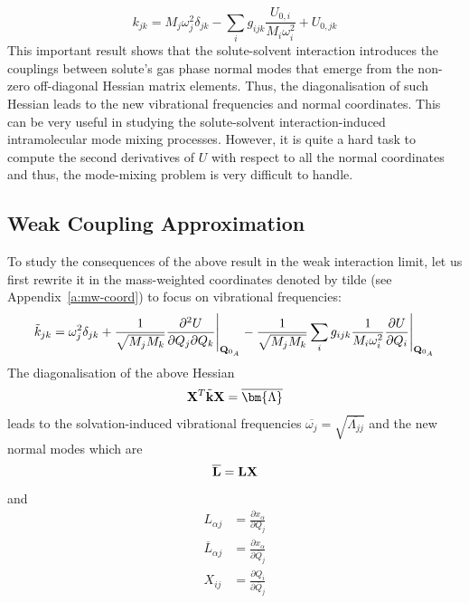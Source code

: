 \documentclass[b5paper,oneside,fleqn,11pt]{book}
\newcommand{\BM}[1]{\bm{#1}}
\newcommand{\fderiv}[2]{\ensuremath{
    \frac{\partial #1}{\partial #2}}}
\newcommand{\sderivd}[3]{\ensuremath{
    \frac{\partial^2 #1}{\partial #2 \partial #3}
    }}
\begin{document}
\begin{refsection}
\begin{equation}
\boxed{
 k_{jk} = M_j \omega_j^2 \delta_{jk} - \sum_i g_{ijk} \frac{U_{0,i}}{M_i\omega_i^2} + U_{0,jk}
}
\end{equation}
%
This important result shows that the solute\hyp{}solvent interaction
introduces the couplings between solute's gas phase
normal modes that emerge from the non\hyp{}zero off\hyp{}diagonal
Hessian matrix elements. Thus, the diagonalisation of such
Hessian leads to the new vibrational frequencies and normal
coordinates. This can be very useful in studying the solute\hyp{}solvent 
interaction\hyp{}induced intramolecular mode
mixing processes. However, it is quite a hard task to 
compute the second derivatives of $U$
with respect to all the normal coordinates and thus, the mode\hyp{}mixing
problem is very difficult to handle. 

\subsection{Weak Coupling Approximation\label{s:wca}}

To study the consequences of the above result in the weak interaction
limit, let us first rewrite it
in the mass\hyp{}weighted
coordinates denoted by tilde (see Appendix~\ref{a:mw-coord}) to focus on vibrational
frequencies:
%
\begin{equation} 
 \tilde{k}_{jk} = \omega_j^2 \delta_{jk} + \frac{1}{\sqrt{M_jM_k}}\sderivd{U}{Q_j}{Q_k}  \Bigg|_{{\bf Q}_{0_A}} 
                           - \frac{1}{\sqrt{M_jM_k}}\sum_i g_{ijk} 
                             \frac{1}{M_i\omega_i^2}\fderiv{U}{Q_i}          \Bigg|_{{\bf Q}_{0_A}}        
\end{equation}
%
The diagonalisation of the above Hessian
%
\begin{equation} 
 {\bf X}^T \tilde{\bf k} {\bf X} = \overline{\BM\Lambda}
\end{equation}
%
leads to the solvation\hyp{}induced vibrational frequencies
$\overline{\omega_j}=\sqrt{\overline{\Lambda_{jj}}}$ 
and the new normal modes which are
%
\begin{equation} 
 \overline{\bf L}  = {\bf L} {\bf X}
\end{equation}
%
and
%
\begin{subequations} \label{eq:L-matrices}
 \begin{align}
            {L}_{\alpha j}  &= \fderiv{x_\alpha}{         {Q}_j} \\
   \overline{L}_{\alpha j}  &= \fderiv{x_\alpha}{\overline{Q}_j} \\
                  X_{ij}    &= \fderiv{Q_i}{\overline{Q}_j}
 \end{align}
\end{subequations}
%


\end{refsection}
\end{document}
